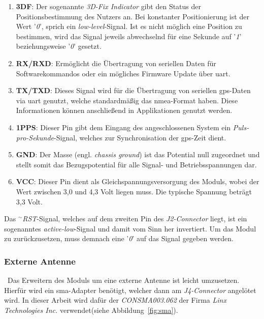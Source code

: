 \begin{enumerate}
\item \textbf{3DF}: Der sogenannte \emph{3D-Fix Indicator} gibt den Status der Positionsbestimmung
                    des Nutzers an. Bei konstanter Positionierung ist der Wert '\emph{0}', sprich ein \emph{low-level}-Signal.
                    Ist es nicht möglich eine Position zu bestimmen, wird das Signal jeweils abwechselnd für eine Sekunde auf
                    '\emph{1}' beziehungsweise '\emph{0}' gesetzt.
\item \textbf{RX/RXD}: Ermöglicht die Übertragung von seriellen Daten für Softwarekommandos oder ein
                    mögliches Firmware Update über \ac{uart}.
\item \textbf{TX/TXD}: Dieses Signal wird für die Übertragung von seriellen \ac{gps}-Daten via \ac{uart} genutzt,
                    welche standardmäßig das \ac{nmea}-Format haben. Diese Informationen können anschließend in Applikationen
                    genutzt werden.
\item \textbf{1PPS}: Dieser Pin gibt dem Eingang des angeschlossenen System ein \emph{Puls-pro-Sekunde}-Signal, welches
                     zur Synchronisation der \ac{gps}-Zeit dient.
\item \textbf{GND}: Der Masse (engl. \emph{chassis ground}) ist das Potential null zugeordnet und stellt somit
                    das Bezugspotential für alle Signal- und Betriebsspannungen dar.
\item \textbf{VCC}: Dieser Pin dient als Gleichspannungsversorgung des Moduls, wobei der Wert zwischen 3,0 und 4,3 Volt
                    liegen muss. Die typische Spannung beträgt 3,3 Volt.
\end{enumerate}

Das \emph{\(^\sim\)RST}-Signal, welches auf dem zweiten Pin des \emph{J2-Connector} liegt, ist ein sogenanntes
\emph{active-low}-Signal und damit vom Sinn her invertiert. Um das Modul zu zurückzusetzen, muss demnach eine
'\emph{0}' auf das Signal gegeben werden.\\

\subsubsection{Externe Antenne}\label{kap:extern}



\ Das Erweitern des Moduls um eine externe Antenne ist leicht umzusetzen. Hierfür
wird ein \ac{sma}-Adapter benötigt, welcher dann am \emph{J4-Connector} angelötet wird.
In dieser Arbeit wird dafür der \emph{CONSMA003.062} der Firma \emph{Linx Technologies Inc.}
verwendet(siehe Abbildung~\ref{fig:sma}).\\

